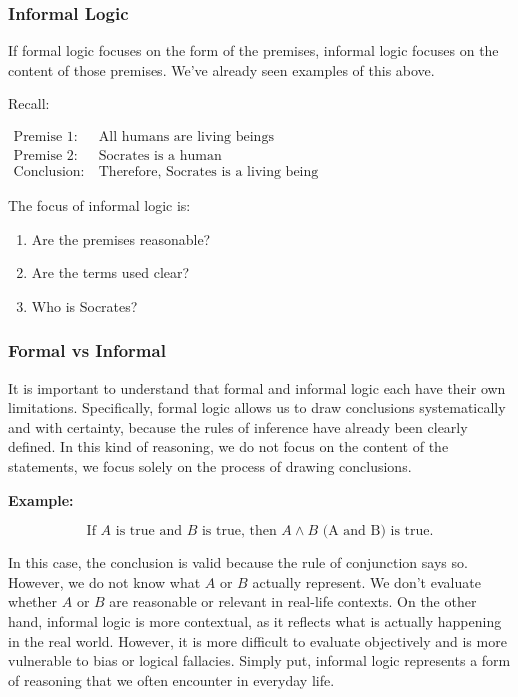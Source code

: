\documentclass[12pt,a4paper,openany]{article}
\begin{document}
\subsubsection{Informal Logic}

If formal logic focuses on the form of the premises, informal logic focuses on the content of those premises. We've already seen examples of this above.

Recall:

$
\begin{aligned}
\text{Premise 1:} \ & \text{All humans are living beings} \\
\text{Premise 2:} \ & \text{Socrates is a human} \\
\text{Conclusion:} \ & \text{Therefore, Socrates is a living being}
\end{aligned}
$

The focus of informal logic is:

\begin{enumerate}
    \item Are the premises reasonable?
    \item Are the terms used clear?
    \item Who is Socrates?
\end{enumerate}

\subsubsection{Formal vs Informal} 

It is important to understand that formal and informal logic each have their own limitations. Specifically, formal logic allows us to draw conclusions systematically and with certainty, because the rules of inference have already been clearly defined. In this kind of reasoning, we do not focus on the content of the statements, we focus solely on the process of drawing conclusions.

\textbf{Example:}

$$ \text{If } A \text{ is true and } B \text{ is true, then } A \land B \text{ (A and B) is true.}$$

In this case, the conclusion is valid because the rule of conjunction says so. However, we do not know what $ A $  or $ B $ actually represent. We don't evaluate whether $ A $ or $ B $ are reasonable or relevant in real-life contexts. On the other hand, informal logic is more contextual, as it reflects what is actually happening in the real world. However, it is more difficult to evaluate objectively and is more vulnerable to bias or logical fallacies. Simply put, informal logic represents a form of reasoning that we often encounter in everyday life.
\end{document}

